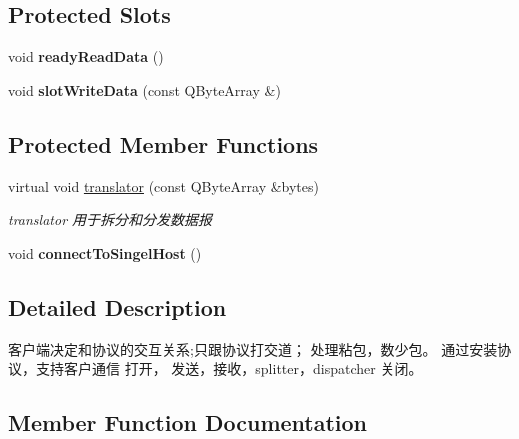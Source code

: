 \subsection*{Protected Slots}
\begin{DoxyCompactItemize}
\item 
\mbox{\label{class_q_qt_tcp_client_ab3af4e75f50f5ddf28040440141ffab6}} 
void {\bfseries ready\+Read\+Data} ()
\item 
\mbox{\label{class_q_qt_tcp_client_af0e36ac8294aaedc498c9a8e1f1d7018}} 
void {\bfseries slot\+Write\+Data} (const Q\+Byte\+Array \&)
\end{DoxyCompactItemize}
\subsection*{Protected Member Functions}
\begin{DoxyCompactItemize}
\item 
virtual void \mbox{\hyperlink{class_q_qt_tcp_client_a9989245e722623a226f38d60c7f357cb}{translator}} (const Q\+Byte\+Array \&bytes)
\begin{DoxyCompactList}\small\item\em translator 用于拆分和分发数据报 \end{DoxyCompactList}\item 
\mbox{\label{class_q_qt_tcp_client_aa1a4d0d2f9eb65475c7e929a24c936b3}} 
void {\bfseries connect\+To\+Singel\+Host} ()
\end{DoxyCompactItemize}


\subsection{Detailed Description}
客户端决定和协议的交互关系;只跟协议打交道； 处理粘包，数少包。 通过安装协议，支持客户通信 打开， 发送，接收，splitter，dispatcher 关闭。 

\subsection{Member Function Documentation}
\mbox{\label{class_q_qt_tcp_client_a9989245e722623a226f38d60c7f357cb}} 
